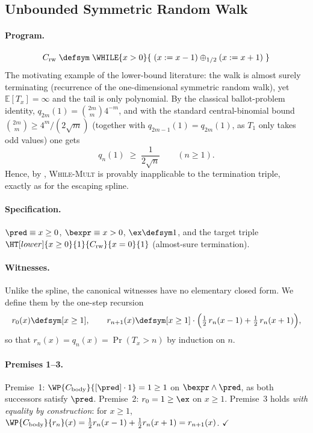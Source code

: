 \subsection{Unbounded Symmetric Random Walk}\label{app:bench-rw}

\paragraph{Program.}
\[
  C_{\text{rw}} \;\defsym\;
  \WHILE{x > 0}{\;
    (x \mathrel{:=} x-1) \oplus_{1/2} (x \mathrel{:=} x+1)
  \;}
\]
The motivating example of the lower-bound literature: the walk is almost
surely terminating (recurrence of the one-dimensional symmetric random
walk), yet $\mathbb{E}[T_x] = \infty$ and the tail is only polynomial. By
the classical ballot-problem identity, $q_{2m}(1) = \binom{2m}{m}4^{-m}$,
and with the standard central-binomial bound
$\binom{2m}{m} \geq 4^m/(2\sqrt{m})$ (together with $q_{2m-1}(1) =
q_{2m}(1)$, as $T_1$ only takes odd values) one gets
\[
  q_n(1) \;\geq\; \frac{1}{2\sqrt{n}}
  \qquad (n \geq 1).
\]
Hence, by , \textsc{While-Mult} is provably inapplicable
to the termination triple, exactly as for the escaping spline.

\paragraph{Specification.}
$\pred \equiv x \geq 0$, $\bexpr \equiv x > 0$, $\ex \defsym 1$, and the
target triple $\HT[lower]{x \geq 0}{1}{C_{\text{rw}}}{x = 0}{1}$
(almost-sure termination).

\paragraph{Witnesses.}
Unlike the spline, the canonical witnesses have no elementary closed form.
We define them by the one-step recursion
\[
  r_0(x) \defsym [x \geq 1],
  \qquad
  r_{n+1}(x) \defsym [x \geq 1]\cdot
    \Bigl(\tfrac12\, r_n(x-1) + \tfrac12\, r_n(x+1)\Bigr),
\]
so that $r_n(x) = q_n(x) = \Pr(T_x > n)$ by induction on $n$.

\paragraph{Premises 1--3.}
Premise~1: $\WP{C_{\text{body}}}{[\pred]\cdot 1} = 1 \geq 1$ on
$\bexpr\land\pred$, as both successors satisfy $\pred$. Premise~2:
$r_0 = 1 \geq \ex$ on $x \geq 1$. Premise~3 holds \emph{with equality by
construction}: for $x \geq 1$,
$\WP{C_{\text{body}}}{r_n}(x) = \tfrac12 r_n(x-1) + \tfrac12 r_n(x+1)
 = r_{n+1}(x)$. $\checkmark$

